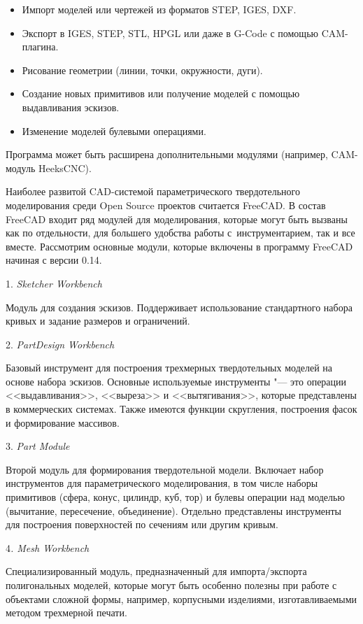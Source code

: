 \begin{itemize}
	\item Импорт моделей или чертежей из форматов STEP, IGES, DXF.
	\item Экспорт в IGES, STEP, STL, HPGL или даже в G-Code с помощью CAM-плагина.
	\item Рисование  геометрии (линии, точки, окружности, дуги).
	\item Создание новых примитивов или получение моделей  с помощью выдавливания эскизов.
	\item Изменение  моделей булевыми операциями.	
\end{itemize}

Программа может быть расширена дополнительными модулями (например, CAM-модуль HeeksCNC).

Наиболее развитой CAD-системой параметрического твердотельного моделирования среди Open Source проектов считается FreeCAD. В состав FreeCAD входит ряд модулей для моделирования, которые могут быть вызваны как по отдельности, для большего удобства работы с~инструментарием, так и все вместе. Рассмотрим основные модули, которые включены в программу FreeCAD начиная с версии 0.14.

1. \textit{Sketcher Workbench}

Модуль для создания эскизов. Поддерживает использование стандартного набора кривых и задание размеров и ограничений.

2. \textit{PartDesign Workbench}

Базовый инструмент для построения трехмерных твердотельных моделей на основе набора эскизов. Основные используемые инструменты "--- это операции <<выдавливания>>, <<выреза>> и <<вытягивания>>, которые представлены в коммерческих системах. Также имеются функции скругления, построения фасок и формирование массивов.

3. \textit{Part Module}

Второй модуль для формирования твердотельной модели. Включает набор инструментов для параметрического моделирования, в том числе наборы примитивов (сфера, конус, цилиндр, куб, тор) и булевы операции над моделью (вычитание, пересечение, объединение). Отдельно представлены инструменты для построения поверхностей по сечениям или другим кривым.

4\textit{. Mesh Workbench}

Специализированный модуль, предназначенный для импорта/экспорта полигональных моделей, которые могут быть особенно полезны при работе с объектами сложной формы, например, корпусными изделиями, изготавливаемыми методом трехмерной печати.

